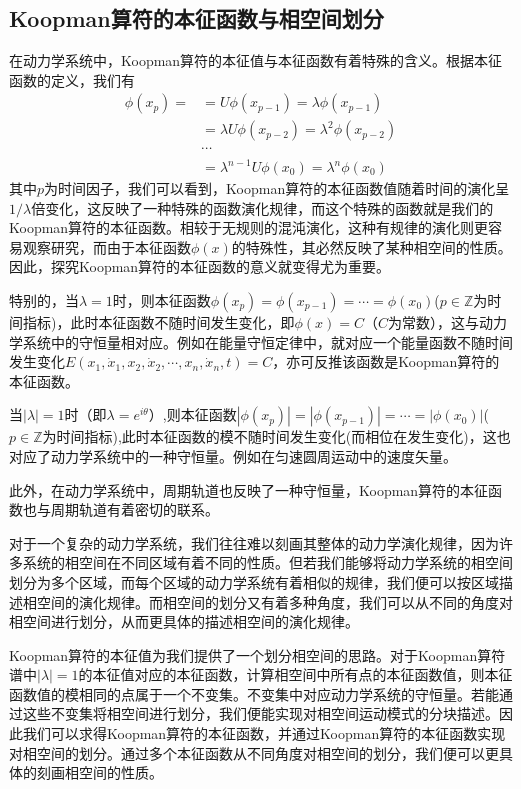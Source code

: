 \subsection{Koopman算符的本征函数与相空间划分}

在动力学系统中，Koopman算符的本征值与本征函数有着特殊的含义。根据本征函数的定义，我们有
\begin{equation}
    \begin{aligned}
        \phi(x_p)=  &=U\phi(x_{p-1})=\lambda\phi(x_{p-1})\\
                    &=\lambda U\phi(x_{p-2})=\lambda^2\phi(x_{p-2})\\
                    &\cdots\\
                    &=\lambda^{n-1}U\phi(x_0)=\lambda^n\phi(x_0)
    \end{aligned}
\end{equation}
其中$p$为时间因子，我们可以看到，Koopman算符的本征函数值随着时间的演化呈$1/\lambda$倍变化，这反映了一种特殊的函数演化规律，而这个特殊的函数就是我们的Koopman算符的本征函数。相较于无规则的混沌演化，这种有规律的演化则更容易观察研究，而由于本征函数$\phi(x)$的特殊性，其必然反映了某种相空间的性质。因此，探究Koopman算符的本征函数的意义就变得尤为重要。

特别的，当$\lambda=1$时，则本征函数$\phi(x_p)=\phi(x_{p-1})=\cdots=\phi(x_{0})$($p\in \mathbb{Z}$为时间指标)，此时本征函数不随时间发生变化，即$\phi(x)=C$（$C$为常数），这与动力学系统中的守恒量相对应。例如在能量守恒定律中，就对应一个能量函数不随时间发生变化$E(x_1,\dot{x}_1,x_2,\dot{x}_2,\cdots,x_n,\dot{x}_n,t)=C$，亦可反推该函数是Koopman算符的本征函数。

当$|\lambda|=1$时（即$\lambda=e^{i\theta}$）,则本征函数$|\phi(x_p)|=|\phi(x_{p-1})|=\cdots=|\phi(x_{0})|$($p\in \mathbb{Z}$为时间指标),此时本征函数的模不随时间发生变化(而相位在发生变化)，这也对应了动力学系统中的一种守恒量。例如在匀速圆周运动中的速度矢量。

此外，在动力学系统中，周期轨道也反映了一种守恒量，Koopman算符的本征函数也与周期轨道有着密切的联系。

对于一个复杂的动力学系统，我们往往难以刻画其整体的动力学演化规律，因为许多系统的相空间在不同区域有着不同的性质。但若我们能够将动力学系统的相空间划分为多个区域，而每个区域的动力学系统有着相似的规律，我们便可以按区域描述相空间的演化规律。而相空间的划分又有着多种角度，我们可以从不同的角度对相空间进行划分，从而更具体的描述相空间的演化规律。

Koopman算符的本征值为我们提供了一个划分相空间的思路。对于Koopman算符谱中$|\lambda|=1$的本征值对应的本征函数，计算相空间中所有点的本征函数值，则本征函数值的模相同的点属于一个不变集。不变集中对应动力学系统的守恒量。若能通过这些不变集将相空间进行划分，我们便能实现对相空间运动模式的分块描述。因此我们可以求得Koopman算符的本征函数，并通过Koopman算符的本征函数实现对相空间的划分。通过多个本征函数从不同角度对相空间的划分，我们便可以更具体的刻画相空间的性质。


